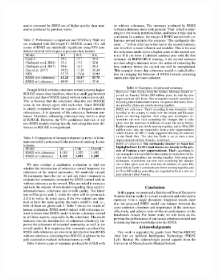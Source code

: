 \begin{figure}[!htbp]
\begin{subfigure}[b]{0.24\textwidth}
        \includegraphics[width=\textwidth]{images/chapter3/formatted_sample3.pdf}
      \end{subfigure}
      \begin{subfigure}[b]{0.24\textwidth}

\end{subfigure}
\end{figure}
